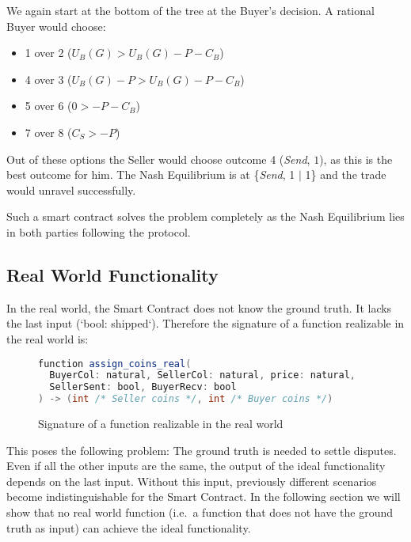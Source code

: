 \documentclass{cacthesis}
\begin{document}

We again start at the bottom of the tree at the Buyer's decision. A rational Buyer would choose: 
\begin{itemize}
    \item 1 over 2 ($U_B(G) > U_B(G) - P - C_B$)
    \item 4 over 3 ($U_B(G) - P > U_B(G) - P - C_B $)
    \item 5 over 6 ($0> -P-C_B$)
    \item 7 over 8 ($C_S > -P$)
\end{itemize}
Out of these options the Seller would choose outcome 4 (\emph{Send}, $1$), as this is the best outcome for him.
The Nash Equilibrium is at \{\emph{Send}, 1 $|$ 1\} and the trade would unravel successfully.\newline

Such a smart contract solves the problem completely as the Nash Equilibrium lies in both parties following the protocol.
\subsection{Real World Functionality}
In the real world, the Smart Contract does not know the ground truth. It lacks the last input (‘bool: shipped‘). Therefore the signature of a function realizable in the real world is:\newline
\begin{figure}[htb!]
\begin{lstlisting}[language=java]
function assign_coins_real(
  BuyerCol: natural, SellerCol: natural, price: natural,
  SellerSent: bool, BuyerRecv: bool
) -> (int /* Seller coins */, int /* Buyer coins */)
\end{lstlisting}
 \centering
    \caption{Signature of a function realizable in the real world}
    \label{fig:real_world_function_signature}
\end{figure}

This poses the following problem: The ground truth is needed to settle disputes. Even if all the other inputs are the same, the output of the ideal functionality depends on the last input. Without this input, previously different scenarios become indistinguishable for the Smart Contract. In the following section we will show that no real world function (i.e.\ a function that does not have the ground truth as input) can achieve the ideal functionality.\newline
\newpage
\end{document}
